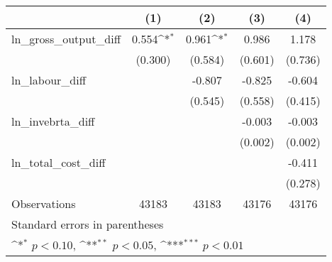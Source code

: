 {
\def\sym#1{\ifmmode^{#1}\else\(^{#1}\)\fi}
\begin{tabular}{l*{4}{c}}
\hline\hline
                &\multicolumn{1}{c}{(1)}         &\multicolumn{1}{c}{(2)}         &\multicolumn{1}{c}{(3)}         &\multicolumn{1}{c}{(4)}         \\
\hline
ln\_gross\_output\_diff&    0.554\sym{*}  &    0.961\sym{*}  &    0.986         &    1.178         \\
                &  (0.300)         &  (0.584)         &  (0.601)         &  (0.736)         \\
[1em]
ln\_labour\_diff  &                  &   -0.807         &   -0.825         &   -0.604         \\
                &                  &  (0.545)         &  (0.558)         &  (0.415)         \\
[1em]
ln\_invebrta\_diff&                  &                  &   -0.003         &   -0.003         \\
                &                  &                  &  (0.002)         &  (0.002)         \\
[1em]
ln\_total\_cost\_diff&                  &                  &                  &   -0.411         \\
                &                  &                  &                  &  (0.278)         \\
\hline
Observations    &    43183         &    43183         &    43176         &    43176         \\
\hline\hline
\multicolumn{5}{l}{\footnotesize Standard errors in parentheses}\\
\multicolumn{5}{l}{\footnotesize \sym{*} \(p<0.10\), \sym{**} \(p<0.05\), \sym{***} \(p<0.01\)}\\
\end{tabular}
}
